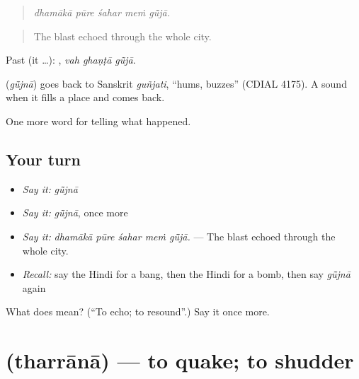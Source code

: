 \begin{quote}
    
\end{quote}

\begin{quote}
\emph{dhamākā pūre śahar meṁ gū̃jā.}
\end{quote}

\begin{quote}
The blast echoed through the whole city.
\end{quote}

Past (it …):   , \emph{vah ghaṇṭā gū̃jā}.

\begin{cousinweb}
\textbf{} (\emph{gū̃jnā}) goes back to Sanskrit \emph{guñjati}, \textquotedblleft{}hums, buzzes\textquotedblright{} (CDIAL 4175). A sound \textbf{ } when it fills a place and comes back.
\end{cousinweb}

\begin{grammarlens}[title={What you've built}]
One more word for telling what happened.
\end{grammarlens}

\subsection*{Your turn}
\begin{itemize}
\raggedright
  \item \emph{Say it:} \emph{gū̃jnā}
  \item \emph{Say it:} \emph{gū̃jnā}, once more
  \item \emph{Say it:} \emph{dhamākā pūre śahar meṁ gū̃jā.} — The blast echoed through the whole city.
  \item \emph{Recall:} say the Hindi for a bang, then the Hindi for a bomb, then say \emph{gū̃jnā} again
\end{itemize}

\begin{tcolorbox}[breakable,colback=teal!4,colframe=teal!35!black,title={Before you move on}]
What does  mean? (\textquotedblleft{}To echo; to resound\textquotedblright{}.) Say it once more.
\end{tcolorbox}
\section[\texorpdfstring{\hi{थर्राना} (tharrānā)}{थर्राना (tharrānā)}]{ (tharrānā) — to quake; to shudder}

